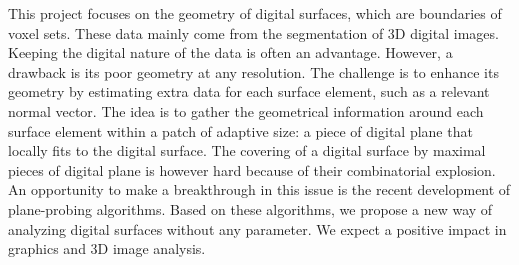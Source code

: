 \documentclass[french]{article}
\begin{document}


This project focuses on the geometry of digital surfaces, which are boundaries of voxel sets. These data mainly come from the segmentation of 3D digital images. Keeping the digital nature of the data is often an advantage. However, a drawback is its poor geometry at any resolution. The challenge is to enhance its geometry by estimating extra data for each surface element, such as a relevant normal vector.
The idea is to gather the geometrical information around each surface element within a patch of adaptive size: a piece of digital plane that locally fits to the digital surface. The covering of a digital surface by maximal pieces of digital plane is however hard because of their combinatorial explosion. An opportunity to make a breakthrough in this issue is the recent development of plane-probing algorithms. Based on these algorithms, we propose a new way of analyzing digital surfaces without any parameter. We expect a positive impact in graphics and 3D image analysis.



\end{document}
